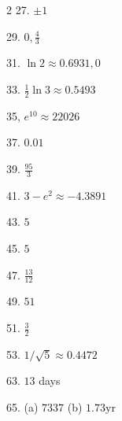 \begin {multicols}{2}
27. $ \pm 1$ 

29. $0 ,\frac{4}{3}$ 

31. $\ln  2 \approx 0.6931 ,0$ 

33. $\frac{1}{2} \ln  3 \approx 0.5493$ 

35, $e^{10} \approx 22026$ 

37. $0.01$ 

39. $\frac{95}{3}$ 

41. $3 -e^{2} \approx  -4.3891$ 

43. $5$ 

45. $5$ 

47. $\frac{13}{12}$ 

49. $51$ 

51. $\frac{3}{2}$ 

53. $1/\sqrt{5} \approx 0.4472$ 

63. $13$ days 

65. (a) $7337$ (b) $1.73 \mbox{y}$r 

\end {multicols}